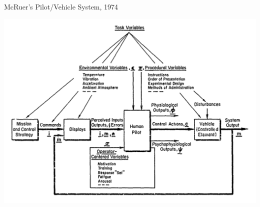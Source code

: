 \documentclass[10pt]{beamer}
\begin{document}
\begin{frame}[fragile]{McRuer's Pilot/Vehicle System, 1974~\cite{McRuer1974}}
  \begin{center}
    \includegraphics[width=\linewidth]{../img/Screen_Shot_2018-07-25_at_10.37.08_AM.png}
  \end{center}
\end{frame}
\end{document}
